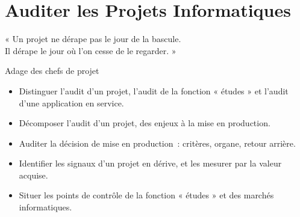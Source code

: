 
\chapter{Auditer les Projets Informatiques}
\label{chap:audit-projets}

\epigraph{%
    « Un projet ne dérape pas le jour de la bascule.\\
    Il dérape le jour où l'on cesse de le regarder. »%
}{Adage des chefs de projet}


\begin{boxobjectifs}
\begin{itemize}
    \item Distinguer l'audit d'un projet, l'audit de la fonction « études »
          et l'audit d'une application en service.
    \item Décomposer l'audit d'un projet, des enjeux à la mise en
          production.
    \item Auditer la décision de mise en production~: critères, organe,
          retour arrière.
    \item Identifier les signaux d'un projet en dérive, et les mesurer par
          la valeur acquise.
    \item Situer les points de contrôle de la fonction « études » et des
          marchés informatiques.
\end{itemize}
\end{boxobjectifs}

